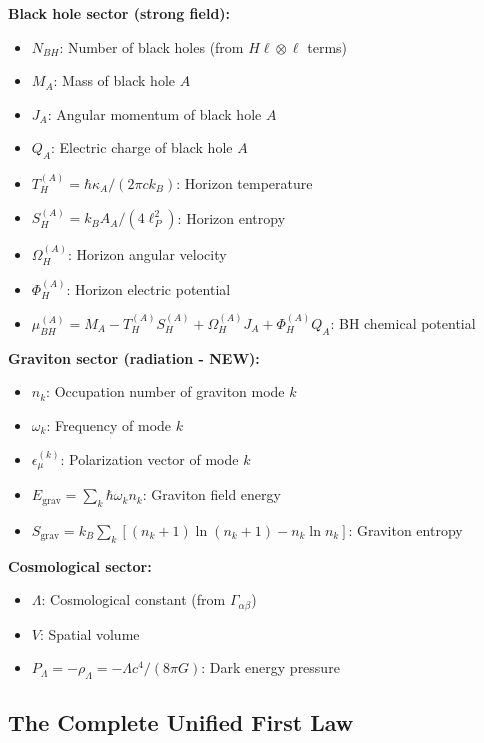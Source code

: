 \documentclass[11pt,a4paper]{article}
\theoremstyle{definition}
\theoremstyle{remark}
\begin{document}
	\textbf{Black hole sector (strong field):}
	\begin{itemize}
		\item $N_{BH}$: Number of black holes (from $H\ell\otimes\ell$ terms)
		\item $M_A$: Mass of black hole $A$
		\item $J_A$: Angular momentum of black hole $A$
		\item $Q_A$: Electric charge of black hole $A$
		\item $T_H^{(A)} = \hbar\kappa_A/(2\pi ck_B)$: Horizon temperature
		\item $S_H^{(A)} = k_B A_A/(4\ell_P^2)$: Horizon entropy
		\item $\Omega_H^{(A)}$: Horizon angular velocity
		\item $\Phi_H^{(A)}$: Horizon electric potential
		\item $\mu_{BH}^{(A)} = M_A - T_H^{(A)} S_H^{(A)} + \Omega_H^{(A)} J_A + \Phi_H^{(A)} Q_A$: BH chemical potential
	\end{itemize}
	
	\textbf{Graviton sector (radiation - NEW):}
	\begin{itemize}
		\item $n_k$: Occupation number of graviton mode $k$
		\item $\omega_k$: Frequency of mode $k$
		\item $\epsilon_\mu^{(k)}$: Polarization vector of mode $k$
		\item $E_{\text{grav}} = \sum_k \hbar\omega_k n_k$: Graviton field energy
		\item $S_{\text{grav}} = k_B \sum_k [(n_k+1)\ln(n_k+1) - n_k\ln n_k]$: Graviton entropy
	\end{itemize}
	
	\textbf{Cosmological sector:}
	\begin{itemize}
		\item $\Lambda$: Cosmological constant (from $\Gamma_{\alpha\beta}$)
		\item $V$: Spatial volume
		\item $P_\Lambda = -\rho_\Lambda = -\Lambda c^4/(8\pi G)$: Dark energy pressure
	\end{itemize}
	
	\subsection{The Complete Unified First Law}
	
\end{document}
